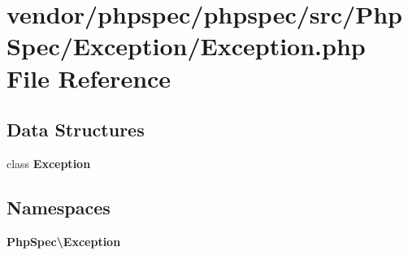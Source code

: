 \section{vendor/phpspec/phpspec/src/\+Php\+Spec/\+Exception/\+Exception.php File Reference}
\label{phpspec_2phpspec_2src_2_php_spec_2_exception_2_exception_8php}
\subsection*{Data Structures}
\begin{DoxyCompactItemize}
\item 
class {\bf Exception}
\end{DoxyCompactItemize}
\subsection*{Namespaces}
\begin{DoxyCompactItemize}
\item 
 {\bf Php\+Spec\textbackslash{}\+Exception}
\end{DoxyCompactItemize}
